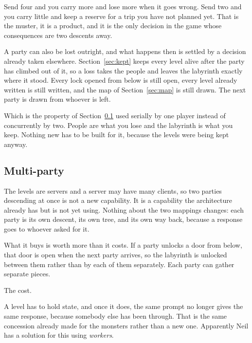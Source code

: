 \documentclass[11pt,a4paper]{article}
\begin{document}
\begin{sectionbox}
Send four and you carry more and lose more when it goes wrong. Send two and you carry little and
keep a reserve for a trip you have not planned yet. That is the muster, it is a product, and it is
the only decision in the game whose consequences are two descents away.
\end{sectionbox}

A party can also be lost outright, and what happens then is settled by a decision already taken
elsewhere. Section~\ref{sec:kept} keeps every level alive after the party has climbed out of it,
so a loss takes the people and leaves the labyrinth exactly where it stood. Every lock opened from
below is still open, every level already written is still written, and the map of
Section~\ref{sec:map} is still drawn. The next party is drawn from whoever is left.

\begin{sectionbox}
Which is the property of Section~\ref{sec:multi} used serially by one player instead of
concurrently by two. People are what you lose and the labyrinth is what you keep. Nothing new has
to be built for it, because the levels were being kept anyway.
\end{sectionbox}

\subsection{Multi-party}
\label{sec:multi}

The levels are servers and a server may have many clients, so two parties descending at once is
not a new capability. It is a capability the architecture already has but is not yet using.
Nothing about the two mappings changes: each party is its own descent, its own tree, and its own way back, because
a response goes to whoever asked for it.

What it buys is worth more than it costs. If a party unlocks a door from below, that door is open
when the next party arrives, so the labyrinth is unlocked between them rather than by each of
them separately. Each party can gather separate pieces.

The cost.

A level has to hold state, and once it does, the same prompt no longer gives the same response,
because somebody else has been through. That is the same concession already made for the
monsters rather than a new one. Apparently Neil has a solution for this using \emph{workers}.
\end{document}
